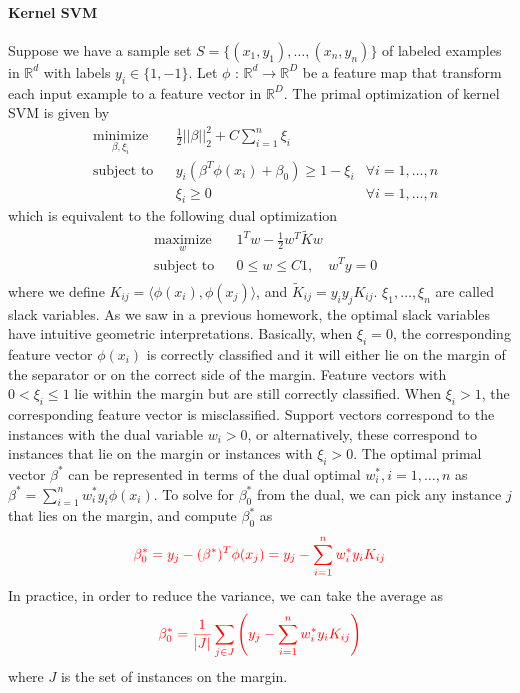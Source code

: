 \documentclass{article}
\theoremstyle{remark}
\theoremstyle{definition}
\newcommand{\RR}{\mathbb{R}}
\begin{document}
\paragraph{Kernel SVM} Suppose we have a sample set
$S = \{(x_1,y_1),\ldots,(x_n,y_n)\}$ of labeled examples in $\RR^d$ with labels
$y_i \in \{1,-1\}$. Let $\phi$ : $\RR^d\to\RR^D$ be a feature map that transform
each input example to a feature vector in $\RR^D$. The primal optimization of
kernel SVM is given by
$$
\begin{aligned}
& \underset{\beta, \xi_i}{\text{minimize}} && \frac{1}{2}||\beta||_2^2 + C\sum_{i=1}^n\xi_i\\
& \text{subject to} && y_i(\beta^T\phi(x_i) + \beta_0) \geq 1-\xi_i & \forall i = 1,\ldots, n\\
& && \xi_i \geq 0 & \forall i = 1,\ldots, n
\end{aligned}
$$
which is equivalent to the following dual optimization
\begin{equation}
\label{eq:dual}
\begin{aligned} 
  & \underset{w}{\text{maximize}} && 1^Tw - \frac{1}{2}w^T \tilde{K}w \\
  & \text{subject to} && 0\leq w\leq C1, \quad w^Ty = 0\\
\end{aligned}
\end{equation}
where we define $K_{ij} = \langle\phi(x_i), \phi(x_j)\rangle$, and $\tilde{K}_{ij} = y_iy_jK_{ij}$. $\xi_1,\ldots, \xi_n$ are called slack variables. As we saw in a previous
homework, the optimal slack variables have intuitive geometric
interpretations. Basically, when $\xi_i = 0$, the corresponding feature vector
$\phi(x_i)$ is correctly classified and it will either lie on the margin of the
separator or on the correct side of the margin. Feature vectors with
$0 < \xi_i \leq 1$ lie within the margin but are still correctly
classified. When $\xi_i > 1$, the corresponding feature vector is
misclassified. Support vectors correspond to the instances with the dual
variable $w_i > 0$, or alternatively, these correspond to instances that
lie on the margin or instances with $\xi_i > 0$. The optimal primal vector
$\beta^*$ can be represented in terms of the dual optimal $w^*_i, i=1,\ldots, n$ as
$\beta^* = \sum_{i=1}^n w^*_iy_i\phi(x_i)$. To solve for $\beta^*_0$ from the
dual, we can pick any instance $j$ that lies on the margin, and compute
$\beta^*_0$ as 
$$\textcolor{red}{\beta^*_0 = y_j - (\beta^*)^T\phi(x_j) = y_j - \sum_{i=1}^n w_i^* y_iK_{ij}}$$
In practice, in order to reduce the variance, we can take the average as
$$\textcolor{red}{\beta^*_0 = \frac{1}{|J|}\sum_{j\in J}\left(y_j - \sum_{i=1}^n w_i^* y_iK_{ij}\right)}$$
where $J$ is the set of instances on the margin.
\end{document}
